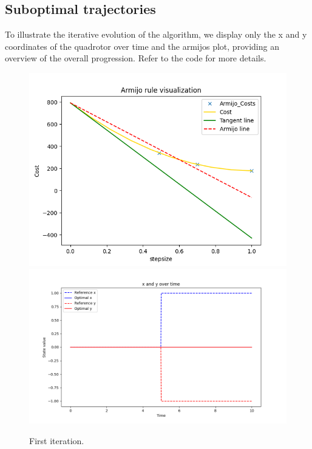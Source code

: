 \subsection{Suboptimal trajectories}
To illustrate the iterative evolution of the algorithm, we display only the x and y coordinates of the quadrotor over time and the armijos plot, providing an overview of the overall progression. Refer to the code for more details.
\begin{figure}[H]
  \centering
  \includegraphics[width=1\textwidth]{pictures/arm_it_1.png}\hfill \\
  \includegraphics[width=1\textwidth]{pictures/new_it_1.png}\hfill
  \caption{First iteration.}
  \label{fig:Reference trajectory}
\end{figure}


